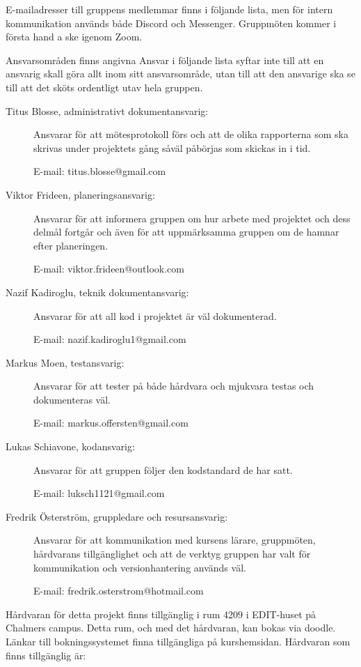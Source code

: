 \documentclass[a4paper]{article}
\begin{document}
E-mailadresser till gruppens medlemmar finns i följande lista, men för intern kommunikation används både Discord och Messenger. Gruppmöten kommer i första hand a ske igenom Zoom.

Ansvarsområden finns angivna 
Ansvar i följande lista syftar inte till att en ansvarig skall göra allt inom sitt ansvarsområde, utan till att den ansvarige ska se till att det sköts ordentligt utav hela gruppen.

\begin{description}
    \item[Titus Blosse, administrativt dokumentansvarig:] Ansvarar för att mötesprotokoll förs och att de olika rapporterna som ska skrivas under projektets gång såväl påbörjas som skickas in i tid.

    E-mail: titus.blosse@gmail.com

    \item[Viktor Frideen, planeringsansvarig:] Ansvarar för att informera gruppen om hur arbete med projektet och dess delmål fortgår och även för att uppmärksamma gruppen om de hamnar efter planeringen.

    E-mail: viktor.frideen@outlook.com

    \item[Nazif Kadiroglu, teknik dokumentansvarig:] Ansvarar för att all kod i projektet är väl dokumenterad.

    E-mail: nazif.kadiroglu1@gmail.com

    \item[Markus Moen, testansvarig:] Ansvarar för att tester på både hårdvara och mjukvara testas och dokumenteras väl.

    E-mail: markus.offersten@gmail.com

    \item[Lukas Schiavone, kodansvarig:] Ansvarar för att gruppen följer den kodstandard de har satt.

    E-mail: luksch1121@gmail.com

    \item[Fredrik Österström, gruppledare och resursansvarig:] Ansvarar för att kommunikation med kursens lärare, gruppmöten, hårdvarans tillgänglighet och att de verktyg gruppen har valt för kommunikation och versionhantering används väl.

    E-mail: fredrik.osterstrom@hotmail.com
\end{description}

Hårdvaran för detta projekt finns tillgänglig i rum 4209 i EDIT-huset på Chalmers campus. Detta rum, och med det hårdvaran, kan bokas via doodle. Länkar till bokningssystemet finna tillgängliga på kurshemsidan. Hårdvaran som finns tillgänglig är:
\end{document}
